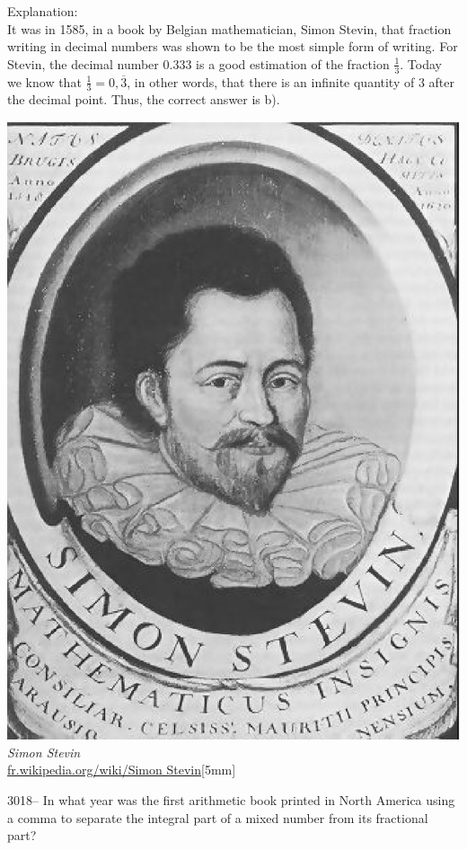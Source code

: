 \documentclass[letterpaper, 12pt]{article}
\begin{document}
Explanation:\\
It was in 1585, in a book by Belgian mathematician, Simon Stevin, that fraction writing in decimal numbers was shown to be the most simple form of writing. For Stevin, the decimal number $0.333$ is a good estimation of the fraction $\frac{1}{3}$. Today we know that $\frac{1}{3} = 0,\overline3$, in other words, that there is an infinite quantity of 3 after the decimal point. Thus, the correct answer is b).\\
\begin{center}
\includegraphics[scale=0.25]{stevin.eps}\\
\emph{{\small Simon Stevin}}\\
\href{http://fr.wikipedia.org/wiki/Simon Stevin}{fr.wikipedia.org/wiki/Simon Stevin}[5mm]
\end{center}



3018-- In what year was the first arithmetic book printed in North America using a comma to separate the integral part of a mixed number from its fractional part?\\
\end{document}
